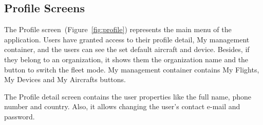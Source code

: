 \subsection{Profile Screens}\label{subsec:profile-screens}
The Profile screen~(Figure~\ref{fig:profile}) represents the main menu of the application.
Users have granted access to their profile detail, My management container, and the users can see the set default aircraft and device.
Besides, if they belong to an organization, it shows them the organization name and the button to switch the fleet mode.
My management container contains My Flights, My Devices and My Aircrafts buttons.

The Profile detail screen contains the user properties like the full name, phone number and country.
Also, it allows changing the user's contact e-mail and password.


